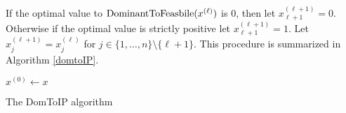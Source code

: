 \documentclass[runningheads]{llncs}
\begin{document}
If the optimal value to $\operatorname{DominantToFeasbile}(x^{(\ell)})$ is 0, then let $x^{(\ell+1)}_{\ell+1} = 0$. Otherwise if the optimal value is strictly positive let $x^{(\ell+1)}_{\ell+1} = 1$. Let $x^{(\ell+1)}_j = x^{(\ell)}_j$ for $j\in \{1,\ldots,n\}\setminus \{\ell+1\}$. This procedure is summarized in Algorithm \ref{domtoIP}.

\begin{algorithm}[H]\label{domtoIP}
	$x^{(0)}\leftarrow x$\\
	\caption{The DomToIP algorithm}
\end{algorithm}
\end{document}
